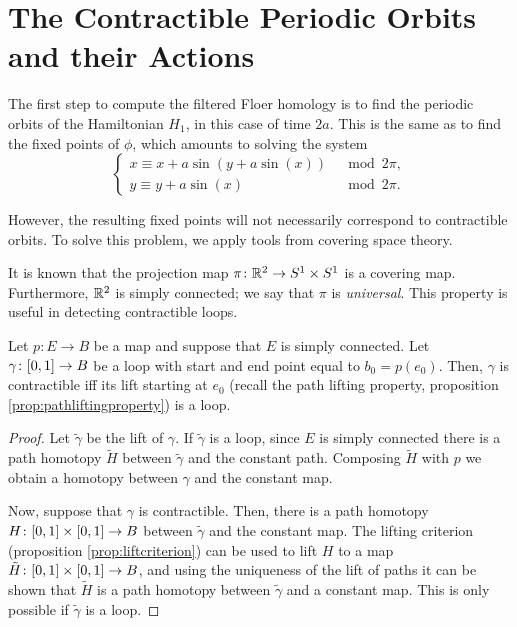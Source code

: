 \section{The Contractible Periodic Orbits and their Actions}

The first step to compute the filtered Floer homology is to find the periodic orbits of the Hamiltonian $H_1$, in this case of time $2a$. This is the same as to find the fixed points of $\phi$, which amounts to solving the system
\begin{equation}\label{eq:fpphi1}
\begin{cases}
x \equiv x + a \sin(y + a \sin(x)) &\mod 2\pi,\\
y \equiv y + a \sin(x) &\mod 2\pi.
\end{cases}
\end{equation}

However, the resulting fixed points will not necessarily correspond to contractible orbits. To solve this problem, we apply tools from covering space theory.

It is known that the projection map $\pi \colon \mathbb{R}^2 \to S^1 \times S^1$ is a covering map. Furthermore, $\mathbb{R}^2$ is simply connected; we say that $\pi$ is \emph{universal}. This property is useful in detecting contractible loops.

\begin{prop}
Let $p \colon E \to B$ be a map and suppose that $E$ is simply connected. Let $\gamma \colon \interval01 \to B$ be a loop with start and end point equal to $b_0 = p(e_0)$. Then, $\gamma$ is contractible iff its lift starting at $e_0$ (recall the path lifting property, proposition \ref{prop:pathliftingproperty}) is a loop.
\end{prop}

\begin{proof}
Let $\tilde \gamma$ be the lift of $\gamma$. If $\tilde \gamma$ is a loop, since $E$ is simply connected there is a path homotopy $\tilde H$ between $\tilde \gamma$ and the constant path. Composing $\tilde H$ with $p$ we obtain a homotopy between $\gamma$ and the constant map.

Now, suppose that $\gamma$ is contractible. Then, there is a path homotopy $H \colon \interval01 \times \interval01 \to B$ between $\tilde \gamma$ and the constant map. The lifting criterion (proposition \ref{prop:liftcriterion}) can be used to lift $H$ to a map $\tilde H \colon \interval01 \times \interval01 \to B$, and using the uniqueness of the lift of paths it can be shown that $\tilde H$ is a path homotopy between $\tilde \gamma$ and a constant map. This is only possible if $\tilde \gamma$ is a loop.
\end{proof}


